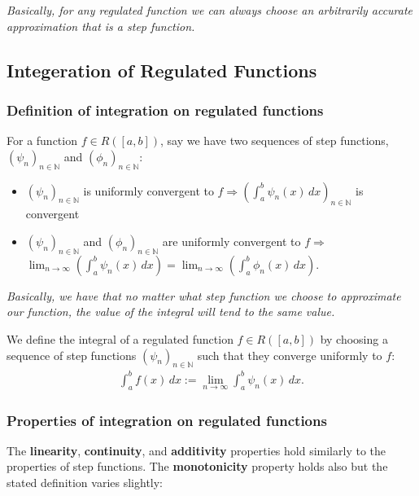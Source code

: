 \documentclass[a4paper, 12pt, twoside]{article}
\begin{document}
\textit{Basically, for any regulated function we can always choose an
      arbitrarily accurate approximation that is a step function.}

\subsection{Integeration of Regulated Functions}

\subsubsection{Definition of integration on regulated functions}

For a function $f \in R([a, b])$, say we have two sequences of step
functions, $(\psi_n)_{n\in\mathbb{N}}$ and $(\phi_n)_{n\in\mathbb{N}}$:

\begin{itemize}
      \item $(\psi_n)_{n\in\mathbb{N}}$ is uniformly convergent to $f
                  \Rightarrow (\int_a^b\psi_n(x)\,dx)_{n\in\mathbb{N}}$ is
            convergent
      \item $(\psi_n)_{n\in\mathbb{N}}$ and $(\phi_n)_{n\in\mathbb{N}}$
            are uniformly convergent to $f \Rightarrow$ \\
            $\lim_{n\to\infty}(\int_a^b\psi_n(x)\,dx)
                  = \lim_{n\to\infty}(\int_a^b\phi_n(x)\,dx)$.
\end{itemize}

\textit{Basically, we have that no matter what step function we choose to
      approximate our function, the value of the integral will tend to the same
      value.}

\vspace{\baselineskip}

We define the integral of a regulated function $f \in R([a, b])$ by choosing
a sequence of step functions $(\psi_n)_{n\in\mathbb{N}}$ such that they
converge uniformly to $f$:
\begin{align*}
      \int_a^b f(x) \, dx := \lim_{n\to\infty} \int_a^b \psi_n(x) \, dx.
\end{align*}

\subsubsection{Properties of integration on regulated functions}

The \textbf{linearity}, \textbf{continuity}, and \textbf{additivity} properties
hold similarly to the properties of step functions. The \textbf{monotonicity}
property holds also but the stated definition varies slightly:
\end{document}
